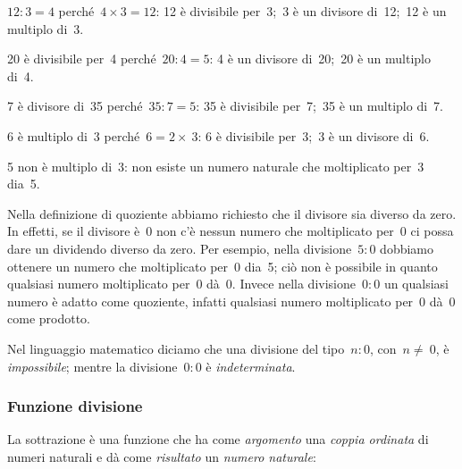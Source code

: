  \begin{esempio}
\(12:3=4\) perché~\(4 \times 3 = 12\): 
12 è divisibile per~3;~3 è un divisore di~12;~12 è un multiplo di~3.
 \end{esempio}

 \begin{esempio}
20 è divisibile per~4 perché~\(20:4=5\):
4 è un divisore di~20;~20 è un multiplo di~4.
 \end{esempio}

 \begin{esempio}
7 è divisore di~35 perché~\(35:7=5\): 
35 è divisibile per~7;~35 è un multiplo di~7.
 \end{esempio}

 \begin{esempio}
6 è multiplo di~3 perché~\(6=2\times~3\):
6 è divisibile per~3;~3 è un divisore di~6.
 \end{esempio}

 \begin{esempio}
5 non è multiplo di~3: non esiste un numero naturale che moltiplicato 
per~3 dia~5.
 \end{esempio}

\osservazione Nella definizione di quoziente abbiamo richiesto che il 
divisore sia diverso da zero. In effetti, se il divisore è~0 non c'è nessun 
numero che moltiplicato per~0 ci possa dare un dividendo diverso da zero.
Per esempio, nella divisione~\(5:0\) dobbiamo ottenere un numero che 
moltiplicato per~0 dia~5; ciò non è possibile in quanto qualsiasi numero 
moltiplicato per~0 dà~0.
Invece nella divisione~\(0:0\) un qualsiasi numero è adatto come quoziente, 
infatti qualsiasi numero moltiplicato per~0 dà~0 come prodotto.

Nel linguaggio matematico diciamo che una divisione del tipo~\(n:0\), 
con~\(n\neq~0\), è \emph{impossibile}; mentre la divisione~\(0:0\) è 
\emph{indeterminata}.

\subsubsection{Funzione divisione}

La sottrazione è una funzione che ha come \emph{argomento} una \emph{coppia 
ordinata} di numeri naturali e dà come \emph{risultato} un \emph{numero 
naturale}:

